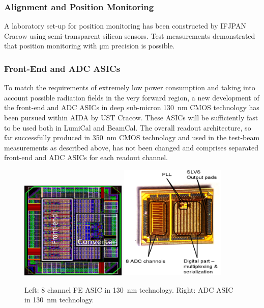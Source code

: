 \subsubsection{Alignment and Position Monitoring }

A laboratory set-up for position monitoring has been constructed by IFJPAN Cracow using semi-transparent
silicon sensors. Test measurements demonstrated that position monitoring with \si{\micro\meter} precision is possible.

\subsubsection{Front-End and ADC ASICs}


To match the requirements of extremely low power consumption and taking into account possible radiation
fields in the very forward region, a new development of the front-end and ADC ASICs in deep sub-micron
\SI{130}{nm} CMOS technology has been
pursued within AIDA by UST Cracow.
These ASICs will be sufficiently fast to be used both in LumiCal and BeamCal.
The overall readout architecture, so far successfully produced in \SI{350}{nm} CMOS technology and used in the test-beam
measurements as described above, has not been changed and comprises separated front-end
and ADC ASICs for each readout channel.
\begin{figure}[hbp]
\centering
    \includegraphics[width=0.45\textwidth]{Calorimeter/FCAL/figs/FE_ASIC.png} \hfill
	\includegraphics[width=0.45\textwidth]{Calorimeter/FCAL/figs/ADC_ASIC_2.png}
	\caption{Left: 8 channel FE ASIC in \SI{130}{nm} technology.
		 	 Right: ADC ASIC in \SI{130}{nm} technology.}
    \label{fig:ASIC_ADC}
\end{figure}
